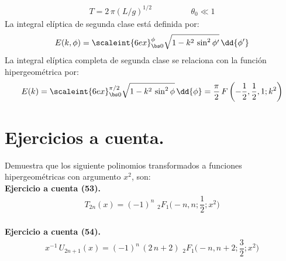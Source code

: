 \begin{align*}
T = 2 \, \pi (L / g)^{1/2} \hspace{2cm} \theta_{0} \ll 1
\end{align*}
La integral elíptica de segunda clase está definida por:
\begin{align*}
E (k, \phi) = \scaleint{6ex}_{\bs 0}^{\phi} \sqrt{1 - k^{2} \, \sin^{2} \phi^{\prime}} \, \dd{\phi^{\prime}}
\end{align*}
La integral elíptica completa de segunda clase se relaciona con la función hipergeométrica por:
\begin{equation}
E(k) = \scaleint{6ex}_{\bs 0}^{\pi/2} \sqrt{1 - k^{2} \, \sin^{2} \phi} \, \dd{\phi} =  \dfrac{\pi}{2} \, F \left( -\dfrac{1}{2}, \dfrac{1}{2}, 1; k^{2} \right)
\end{equation}

\section{Ejercicios a cuenta.}

\noindent
Demuestra que los siguiente polinomios transformados a funciones hipergeométricas con argumento $x^{2}$, son:
\\
\noindent
\textbf{Ejercicio a cuenta (53). }
\begin{align*}
T_{2n} (x) = (-1)^{n} \, \, {}_{2}F_{1} \bigg(-n, n; \dfrac{1}{2}; x^{2} \bigg)
\end{align*}
\\[1em]
\noindent
\textbf{Ejercicio a cuenta (54). }
\begin{align*}
x^{-1} \, U_{2n+1} (x) = (-1)^{n} \, (2 \, n + 2) \, \, {}_{2}F_{1} \bigg(-n, n + 2; \dfrac{3}{2}; x^{2} \bigg)
\end{align*}
